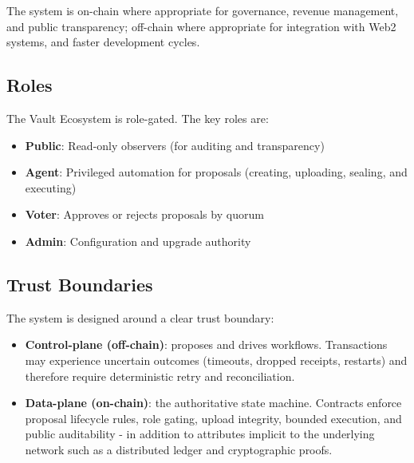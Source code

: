 \documentclass[10pt]{article}
\begin{document}
\begin{GsNoteHigh}
    The system is on-chain where appropriate for governance, revenue management, and public transparency;
    off-chain where appropriate for integration with Web2 systems, and faster development cycles.
\end{GsNoteHigh}

\subsection{Roles}
The Vault Ecosystem is role-gated. The key roles are:

\begin{itemize}
    \item \textbf{Public}: Read-only observers (for auditing and transparency)
    \item \textbf{Agent}: Privileged automation for proposals (creating, uploading, sealing, and executing)
    \item \textbf{Voter}: Approves or rejects proposals by quorum
    \item \textbf{Admin}: Configuration and upgrade authority
\end{itemize}

\subsection{Trust Boundaries}
The system is designed around a clear trust boundary:

\begin{itemize}
    \item \textbf{Control-plane (off-chain)}: proposes and drives workflows.
          Transactions may experience uncertain outcomes (timeouts, dropped
          receipts, restarts) and therefore require deterministic retry and
          reconciliation.

    \item \textbf{Data-plane (on-chain)}: the authoritative state machine.
          Contracts enforce proposal lifecycle rules, role gating, upload integrity,
          bounded execution, and public auditability - in addition to attributes implicit
          to the underlying network such as a distributed ledger and cryptographic proofs.
\end{itemize}
\end{document}
